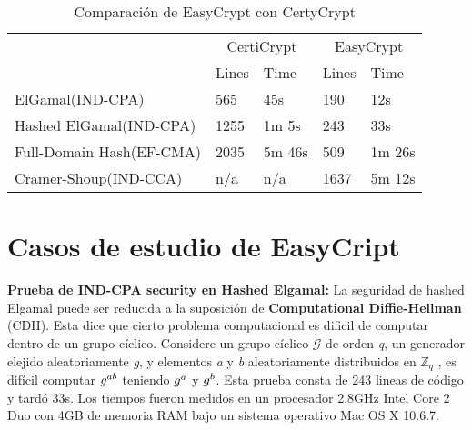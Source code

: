 \documentclass[runningheads]{llncs}
\begin{document}
\begin{table}[H]
  \caption{Comparación de EasyCrypt con CertyCrypt}
  \label{tab:simple}
  \centering
  \begin{tabular}{ |p{3cm}|p{3cm}|p{3cm}|p{3cm}|p{3cm}|  }
 \hline
 & \multicolumn{2}{|c|}{CertiCrypt} & \multicolumn{2}{|c|}{EasyCrypt} \\\cline{2-5}

 &Lines&Time&Lines&Time\\\cline{2-5}
 \hline
 ElGamal(IND-CPA)   & 565    &45s &190 &12s \\
 Hashed ElGamal(IND-CPA)& 1255  & 1m 5s & 243  & 33s\\
 Full-Domain Hash(EF-CMA) &2035 & 5m 46s&  509 & 1m 26s\\
 Cramer-Shoup(IND-CCA)    &n/a & n/a& 1637 &5m 12s\\
 \hline
\end{tabular}
\end{table}



\section{Casos de estudio de EasyCript}

\textbf{Prueba de \textbf{IND-CPA security} en Hashed Elgamal\cite{ref_article5}:}
La seguridad de hashed Elgamal puede ser reducida a la suposición de \textbf{Computational Diffie-Hellman} (CDH). Esta dice que cierto problema computacional es dificil de computar dentro de un grupo cíclico. Considere un grupo cíclico $\mathcal{G}$ de orden \textit{q}, un generador elejido aleatoriamente \textit{g}, y elementos \textit{a} y \textit{b} aleatoriamente distribuidos en $\mathbb{Z}_q$ , es difícil computar $\mathnormal{g^{ab}}$ teniendo $\mathnormal{g^{a}}$ y $\mathnormal{g^{b}}$. Esta prueba consta de 243 lineas de código y tardó 33s. Los tiempos fueron medidos en un procesador 2.8GHz Intel Core 2 Duo con 4GB de memoria RAM bajo un sistema operativo Mac OS X 10.6.7.
\end{document}
